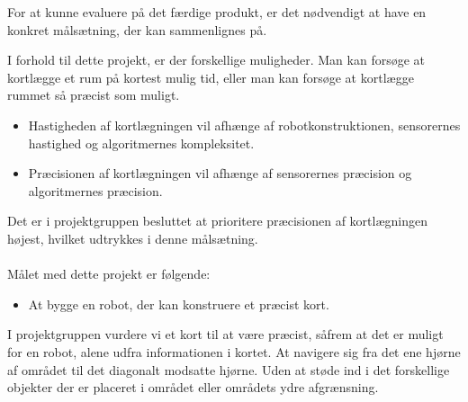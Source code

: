 For at kunne evaluere på det færdige produkt, er det nødvendigt at have en konkret målsætning, der kan sammenlignes på. 

I forhold til dette projekt, er der forskellige muligheder.
Man kan forsøge at kortlægge et rum på kortest mulig tid, eller man kan forsøge at kortlægge rummet så præcist som muligt.

\begin{itemize}
\item Hastigheden af kortlægningen vil afhænge af robotkonstruktionen, sensorernes hastighed og algoritmernes kompleksitet.
\item Præcisionen af kortlægningen vil afhænge af sensorernes præcision og algoritmernes præcision.
\end{itemize}
Det er i projektgruppen besluttet at prioritere præcisionen af kortlægningen højest, hvilket udtrykkes i denne målsætning.

\paragraph{}
\noindent Målet med dette projekt er følgende:
\begin{itemize}
\item At bygge en robot, der kan konstruere et præcist kort.
\end{itemize}
I projektgruppen vurdere vi et kort til at være præcist, såfrem at det er muligt for en robot, alene udfra informationen i kortet.
At navigere sig fra det ene hjørne af området til det diagonalt modsatte hjørne.
Uden at støde ind i det forskellige objekter der er placeret i området eller områdets ydre afgrænsning.